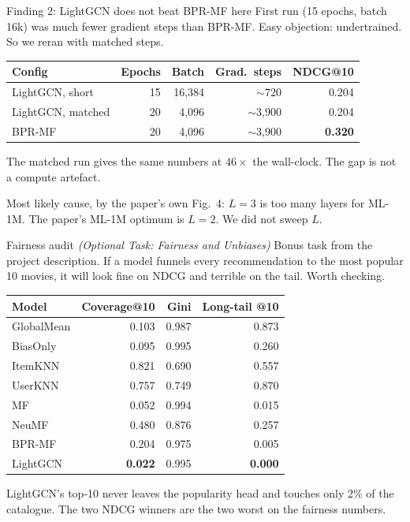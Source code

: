\documentclass[aspectratio=169]{beamer}
\begin{document}
\begin{frame}{Finding 2: LightGCN does not beat BPR-MF here}
  First run (15 epochs, batch 16k) was much fewer gradient steps than BPR-MF. Easy objection: undertrained. So we reran with matched steps.
  \vspace{0.5em}
  \begin{center}\small
  \begin{tabular}{lrrrr}
    \toprule
    Config & Epochs & Batch & Grad.\ steps & NDCG@10 \\
    \midrule
    LightGCN, short   & 15 & 16{,}384 & $\sim$720   & 0.204 \\
    LightGCN, matched & 20 & 4{,}096  & $\sim$3{,}900 & 0.204 \\
    BPR-MF            & 20 & 4{,}096  & $\sim$3{,}900 & \textbf{0.320} \\
    \bottomrule
  \end{tabular}
  \end{center}
  \vspace{0.5em}
  The matched run gives the same numbers at $46\times$ the wall-clock. The gap is not a compute artefact.
  \vspace{0.3em}

  Most likely cause, by the paper's own Fig.~4: $L{=}3$ is too many layers for ML-1M. The paper's ML-1M optimum is $L{=}2$. We did not sweep $L$.
\end{frame}

\begin{frame}{Fairness audit \hfill \small\textit{(Optional Task: Fairness and Unbiases)}}
  Bonus task from the project description. If a model funnels every recommendation to the most popular 10 movies, it will look fine on NDCG and terrible on the tail. Worth checking.
  \vspace{0.3em}
  \begin{center}\small
  \begin{tabular}{lrrr}
    \toprule
    Model & Coverage@10 & Gini & Long-tail @10 \\
    \midrule
    GlobalMean & 0.103 & 0.987 & 0.873 \\
    BiasOnly   & 0.095 & 0.995 & 0.260 \\
    ItemKNN    & 0.821 & 0.690 & 0.557 \\
    UserKNN    & 0.757 & 0.749 & 0.870 \\
    MF         & 0.052 & 0.994 & 0.015 \\
    NeuMF      & 0.480 & 0.876 & 0.257 \\
    BPR-MF     & 0.204 & 0.975 & 0.005 \\
    LightGCN   & \textbf{0.022} & 0.995 & \textbf{0.000} \\
    \bottomrule
  \end{tabular}
  \end{center}
  \vspace{0.3em}
  LightGCN's top-10 never leaves the popularity head and touches only 2\% of the catalogue. The two NDCG winners are the two worst on the fairness numbers.
\end{frame}
\end{document}
